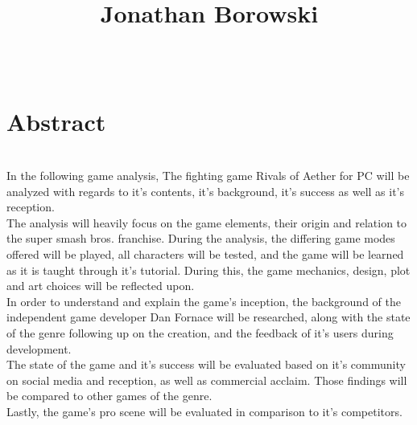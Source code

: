 \documentclass[11pt]{article}
\begin{document}
\title{Jonathan Borowski}
$  $\chapter{Abstract}\\
In the following game analysis, The fighting game Rivals of Aether for PC will be analyzed with regards to it's contents, it's background, it's success as well as it's reception.\\
The analysis will heavily focus on the game elements, their origin and relation to the super smash bros. franchise. During the analysis, the differing game modes offered will be played, all characters will be tested, and the game will be learned as it is taught through it's tutorial. During this, the game mechanics, design, plot and art choices will be reflected upon.\\
In order to understand and explain the game's inception, the background of the independent game developer Dan Fornace will be researched, along with the state of the genre following up on the creation, and the feedback of it's users during development.\\
The state of the game and it's success will be evaluated based on it's community on social media and reception, as well as commercial acclaim. Those findings will be compared to other games of the genre.\\Lastly, the game's pro scene will be evaluated in comparison to it's competitors.\\
\newpage
\end{document}
